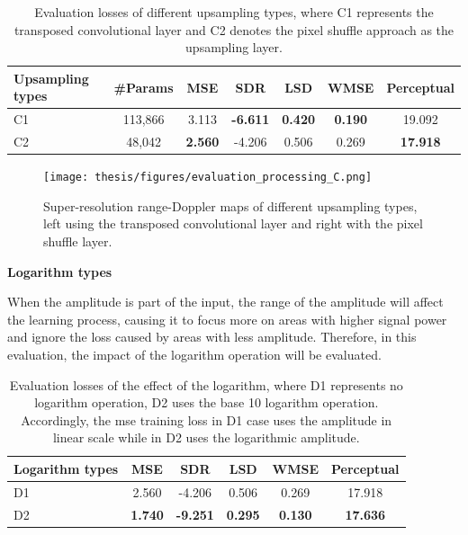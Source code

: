 \begin{table}
    \centering
    \caption{Evaluation losses of different upsampling types, where C1 represents the transposed convolutional layer and C2 denotes the pixel shuffle approach as the upsampling layer.}
    \label{Evaluation losses of the upsampling types comparison}
    \begin{tabular}{l|c|c|c|c|c|c}
        \hline
        Upsampling types & \#Params & MSE & SDR & LSD & WMSE & Perceptual \\
        \hline
        C1 & 113,866 & 3.113 & \textbf{-6.611} & \textbf{0.420} & \textbf{0.190} & 19.092 \\
        \hline
        C2 & 48,042 & \textbf{2.560} & -4.206 & 0.506 & 0.269 & \textbf{17.918} \\
        \hline
    \end{tabular}
\end{table}

\begin{figure}
    \centering
    \texttt{[image: thesis/figures/evaluation\_processing\_C.png]}
    \caption{Super-resolution range-Doppler maps of different upsampling types, left using the transposed convolutional layer and right with the pixel shuffle layer.}
    \label{super-resolution images of the upsampling types}
\end{figure}


\begin{spacing}{1.5}
\textbf{\large{Logarithm types}}
\end{spacing}
When the amplitude is part of the input, the range of the amplitude will affect the learning process, causing it to focus more on areas with higher signal power and ignore the loss caused by areas with less amplitude. Therefore, in this evaluation, the impact of the logarithm operation will be evaluated.

\begin{table}
    \centering
    \caption{Evaluation losses of the effect of the logarithm, where D1 represents no logarithm operation, D2 uses the base 10 logarithm operation. Accordingly, the \gls{mse} training loss in D1 case uses the amplitude in linear scale while in D2 uses the logarithmic amplitude.}
    \label{Evaluation losses of the logarithm types comparison}
    \begin{tabular}{l|c|c|c|c|c}
        \hline
        Logarithm types & MSE & SDR & LSD & WMSE & Perceptual \\
        \hline
        D1 & 2.560 & -4.206 & 0.506 & 0.269 & 17.918 \\
        \hline
        D2 & \textbf{1.740} & \textbf{-9.251} & \textbf{0.295} & \textbf{0.130} & \textbf{17.636} \\
        \hline
    \end{tabular}
\end{table}


